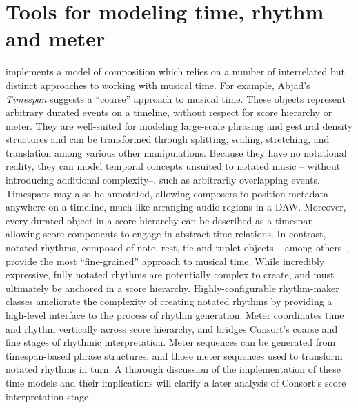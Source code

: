 \chapter{Tools for modeling time, rhythm and meter}
\label{chap:time-tools}

\begin{comment}
<abjad>[hide=true]
import collections
import consort
</abjad>
\end{comment}

 implements a model of composition
which relies on a number of interrelated but distinct approaches to working
with musical time. For example, Abjad's \emph{Timespan} suggests a
\enquote{coarse} approach to musical time. These objects represent arbitrary
durated events on a timeline, without respect for score hierarchy or meter.
They are well-suited for modeling large-scale phrasing and gestural density
structures and can be transformed through splitting, scaling, stretching, and
translation among various other manipulations. Because they have no notational
reality, they can model temporal concepts unsuited to notated music -- without
introducing additional complexity--, such as arbitrarily overlapping events.
Timespans may also be annotated, allowing composers to position metadata
anywhere on a timeline, much like arranging audio regions in a
DAW.\cite{curtis1996computer} Moreover, every durated object in a score
hierarchy can be described as a timespan, allowing score components to engage
in abstract time relations. In contrast, notated rhythms, composed of note,
rest, tie and tuplet objects -- among others--, provide the most
\enquote{fine-grained} approach to musical time. While incredibly expressive,
fully notated rhythms are potentially complex to create, and must ultimately be
anchored in a score hierarchy. Highly-configurable rhythm-maker classes
ameliorate the complexity of creating notated rhythms by providing a high-level
interface to the process of rhythm generation. Meter coordinates time and
rhythm vertically across score hierarchy, and bridges Consort's coarse and fine
stages of rhythmic interpretation. Meter sequences can be generated from
timespan-based phrase structures, and those meter sequences used to transform
notated rhythms in turn. A thorough discussion of the implementation of these
time models and their implications will clarify a later analysis of Consort's
score interpretation stage.

